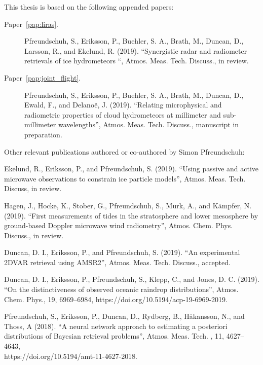 
\begin{refsection}

This thesis is based on the following appended papers:

\begin{description}
\item[Paper~\ref{pap:liras}.] Pfreundschuh, S., Eriksson, P., Buehler, S. A., Brath, M., Duncan, D., Larsson, R., and Ekelund, R. (2019). ``Synergistic radar and radiometer retrievals of ice hydrometeors ``, Atmos. Meas. Tech. Discuss.,  in review.
\item[Paper~\ref{pap:joint_flight}.] Pfreundschuh, S., Eriksson, P., Buehler, S. A., Brath, M., Duncan, D., Ewald, F., and Delanoë, J. (2019). ``Relating microphysical and radiometric properties of cloud hydrometeors at millimeter and sub-millimeter wavelengths'', Atmos. Meas. Tech. Discuss.,   manuscript in preparation.
\end{description}

\vspace{1cm}

\noindent Other relevant publications authored or co-authored by Simon Pfreundschuh:
\begin{description}
\normalsize
\item Ekelund, R., Eriksson, P., and Pfreundschuh, S. (2019). ``Using passive and active microwave observations to constrain ice particle models'', Atmos. Meas. Tech. Discuss, in review.
\item Hagen, J., Hocke, K., Stober, G., Pfreundschuh, S., Murk, A., and Kämpfer, N. (2019). ``First measurements of tides in the stratosphere and lower mesosphere by ground-based Doppler microwave wind radiometry'', Atmos. Chem. Phys. Discuss., in review. 
\item Duncan, D. I., Eriksson, P., and Pfreundschuh, S. (2019). ``An experimental 2DVAR retrieval using AMSR2'', Atmos. Meas. Tech. Discuss., accepted.
\item Duncan, D. I., Eriksson, P., Pfreundschuh, S., Klepp, C., and Jones, D. C. (2019). ``On the distinctiveness of observed oceanic raindrop distributions'', Atmos. Chem. Phys., 19, 6969–6984, https://doi.org/10.5194/acp-19-6969-2019.
\item Pfreundschuh, S., Eriksson, P., Duncan, D., Rydberg, B., Håkansson, N., and Thoss, A (2018). ``A neural network approach to estimating a posteriori distributions of Bayesian retrieval problems'', Atmos. Meas. Tech. , 11, 4627–4643, \\ https://doi.org/10.5194/amt-11-4627-2018.
\end{description}

\end{refsection}
